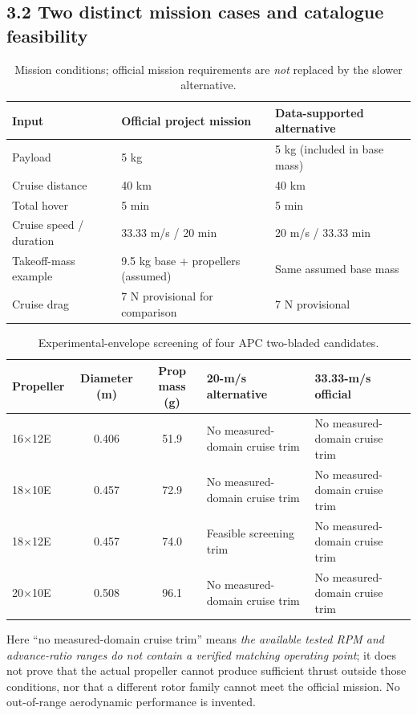 \documentclass[12pt]{article}
\begin{document}
\subsection*{3.2 Two distinct mission cases and catalogue feasibility}
\begin{table}[H]
\centering\small
\caption{Mission conditions; official mission requirements are \emph{not} replaced by the slower alternative.}
\begin{tabularx}{\linewidth}{@{}lXX@{}}
\toprule
Input & Official project mission & Data-supported alternative \\
\midrule
Payload & 5 kg & 5 kg (included in base mass) \\
Cruise distance & 40 km & 40 km \\
Total hover & 5 min & 5 min \\
Cruise speed / duration & 33.33 m/s / 20 min & 20 m/s / 33.33 min \\
Takeoff-mass example & 9.5 kg base + propellers (assumed) & Same assumed base mass \\
Cruise drag & 7 N provisional for comparison & 7 N provisional \\
\bottomrule
\end{tabularx}
\end{table}
\begin{table}[H]
\centering\small
\caption{Experimental-envelope screening of four APC two-bladed candidates.}
\begin{tabularx}{\linewidth}{@{}lccXX@{}}
\toprule
Propeller & Diameter (m) & Prop mass (g) & 20-m/s alternative & 33.33-m/s official \\
\midrule
16$\times$12E & 0.406 & 51.9 & No measured-domain cruise trim & No measured-domain cruise trim \\
18$\times$10E & 0.457 & 72.9 & No measured-domain cruise trim & No measured-domain cruise trim \\
18$\times$12E & 0.457 & 74.0 & Feasible screening trim & No measured-domain cruise trim \\
20$\times$10E & 0.508 & 96.1 & No measured-domain cruise trim & No measured-domain cruise trim \\
\bottomrule
\end{tabularx}
\end{table}
Here ``no measured-domain cruise trim'' means \emph{the available tested RPM and advance-ratio ranges do not contain a verified matching operating point}; it does not prove that the actual propeller cannot produce sufficient thrust outside those conditions, nor that a different rotor family cannot meet the official mission. No out-of-range aerodynamic performance is invented.
\end{document}
